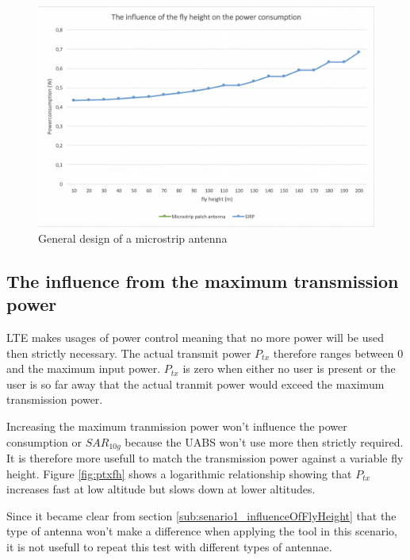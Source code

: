 \begin{figure}[bh!]
  \includegraphics[width=\textwidth]{../results/s1/flyheight-pc.png}
  \caption{General design of a microstrip antenna}
  \label{fig:pcsar}
\end{figure}

\subsection{The influence from the maximum transmission power}
\gls{LTE} makes usages of power control meaning that no more power will be used then strictly necessary. The actual 
transmit power $P_{tx}$ therefore ranges between 0 and the maximum input power. $P_{tx}$ is zero when either no user is 
present or the user is so far away that the actual tranmit power would exceed the maximum transmission power.

Increasing the maximum tranmission power won't influence the power consumption or $SAR_{10g}$ because the \gls{UABS} won't use more
then strictly required. It is therefore more usefull to match the transmission power against a variable fly height. Figure \ref{fig:ptxfh}
shows a logarithmic  relationship showing that $P_{tx}$ increases fast at low altitude but slows down at lower altitudes. 

Since it became clear from section \ref{sub:senario1_influenceOfFlyHeight} that the type of antenna won't make a difference when applying
the tool in this scenario, it is not usefull to repeat this test with different types of antennae.


